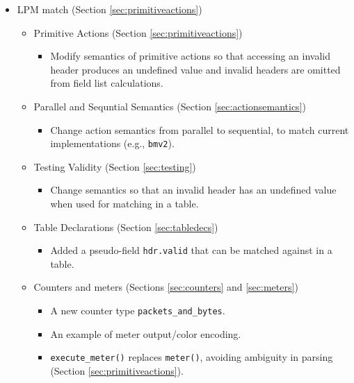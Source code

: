 \documentclass[12pt]{article}
\begin{document}
\begin{itemize}
\item LPM match (Section \ref{sec:primitiveactions})


\begin{itemize}
\item Primitive Actions (Section \ref{sec:primitiveactions})
\begin{itemize}
\item Modify semantics of primitive actions so that accessing an invalid header produces an undefined value and invalid headers are omitted from field list calculations.
\end{itemize}
\item Parallel and Sequntial Semantics (Section \ref{sec:actionsemantics})
\begin{itemize}
\item Change action semantics from parallel to sequential, to match current implementations (e.g., \texttt{bmv2}).
\end{itemize}
\item Testing Validity (Section \ref{sec:testing})
\begin{itemize}
\item Change semantics so that an invalid header has an undefined value when used for matching in a table.
\end{itemize}
\item Table Declarations (Section \ref{sec:tabledecs})
\begin{itemize}
\item Added a pseudo-field \texttt{hdr.valid} that can be matched against in a table.
\end{itemize}
\end{itemize}


\begin{itemize}

\item Counters and meters (Sections \ref{sec:counters} and \ref{sec:meters})
  \begin{itemize}
  \item A new counter type \texttt{packets_and_bytes}.
  \item An example of meter output/color encoding.
  \item \texttt{execute_meter()} replaces \texttt{meter()}, avoiding
  ambiguity in parsing (Section \ref{sec:primitiveactions}). 
  \end{itemize}


\end{itemize}
\end{itemize}
\end{document}
